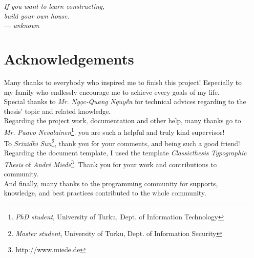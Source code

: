 

\begin{flushright}{\slshape    
If you want to learn constructing, \\
build your own house.} \\ \medskip
--- \emph{unknown}
\end{flushright}

\bigskip


\begingroup

\let\clearpage\relax
\let\cleardoublepage\relax
\let\cleardoublepage\relax

\chapter*{Acknowledgements} %

\noindent Many thanks to everybody who inspired me to finish this project! 
Especially to my family who endlessly encourage me to achieve every goals of my life.  \\

\noindent Special thanks to \emph{Mr. Ng\d{o}c-Quang Nguy\~{\^{e}}n} for technical advices regarding to the thesis' topic and related knowledge. \\

\noindent Regarding the project work, documentation and other help, many thanks go to \emph{Mr. Paavo Nevalainen}\footnote{\emph{PhD student}, University of Turku,  Dept. of Information Technology}. you are such a helpful and truly kind supervisor! \\

\noindent To \emph{Srinidhi Sun}\footnote{\emph{Master student}, University of Turku,  Dept. of Information Security}, thank you for your comments, and being such a good friend! \\


\noindent Regarding the document template, I used the \latex template \emph{Classicthesis Typographic Thesis} of \emph{Andr\'{e} Miede}\footnote{http://www.miede.de}.
Thank you for your work and contributions to \latex community.\\

\noindent And finally, many thanks to the programming community for supports, knowledge, and best practices contributed to the whole community.

\endgroup

